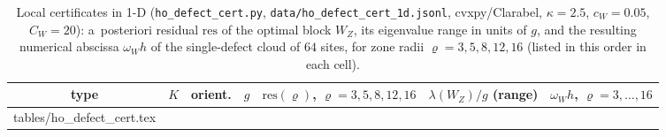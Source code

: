 \documentclass[11pt,a4paper]{article}
\makeatletter
\theoremstyle{plain}
\theoremstyle{definition}
\theoremstyle{remark}
\numberwithin{equation}{section}
\newcommand{\res}{\mathrm{res}}
\newcommand{\inputrows}[1]{\@@input #1 }%
\makeatother
\begin{document}
\begin{table}[t]
\centering
\caption{Local certificates in 1-D (\texttt{ho\_defect\_cert.py}, \texttt{data/ho\_defect\_cert\_1d.jsonl}, cvxpy/Clarabel, $\kappa=2.5$, $c_W=0.05$, $C_W=20$): a~posteriori residual $\res$ of the optimal block $W_Z$, its eigenvalue range in units of $g$, and the resulting numerical abscissa $\omega_Wh$ of the single-defect cloud of $64$ sites, for zone radii $\varrho=3,5,8,12,16$ (listed in this order in each cell).}\label{tab:defectcert}
\scriptsize
\begin{tabular}{cccl>{\raggedright}p{4.4cm}>{\raggedright}p{1.9cm}>{\raggedright\arraybackslash}p{4.0cm}}
\toprule
type & $K$ & orient. & $g$ & $\res(\varrho)$, $\varrho=3,5,8,12,16$ & $\lambda(W_Z)/g$ (range) & $\omega_Wh$, $\varrho=3,\dots,16$\\
\midrule
\inputrows{tables/ho_defect_cert.tex}
\bottomrule
\end{tabular}
\end{table}
\end{document}
